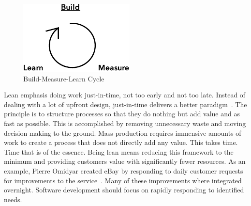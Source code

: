 \documentclass[english]{tktltiki2}
\begin{document}
\begin{figure}[h!]

    \vspace{1cm}
    \centering

    \includegraphics{figures/build-measure-learn}

    \caption{Build-Measure-Learn Cycle}
    \label{figure:build-measure-learn}

\end{figure}

Lean emphasis doing work just-in-time, not too early and not too late. Instead of dealing with a lot of upfront design, just-in-time delivers a better paradigm~\cite{Pop02}. The principle is to structure processes so that they do nothing but add value and as fast as possible. This is accomplished by removing unnecessary waste and moving decision-making to the ground. Mass-production requires immensive amounts of work to create a process that does not directly add any value. This takes time. Time that is of the essence. Being lean means reducing this framework to the minimum and providing customers value with significantly fewer resources. As an example, Pierre Omidyar created eBay by responding to daily customer requests for improvements to the service~\cite{Pop02}. Many of these improvements where integrated overnight. Software development should focus on rapidly responding to identified needs.
\end{document}
